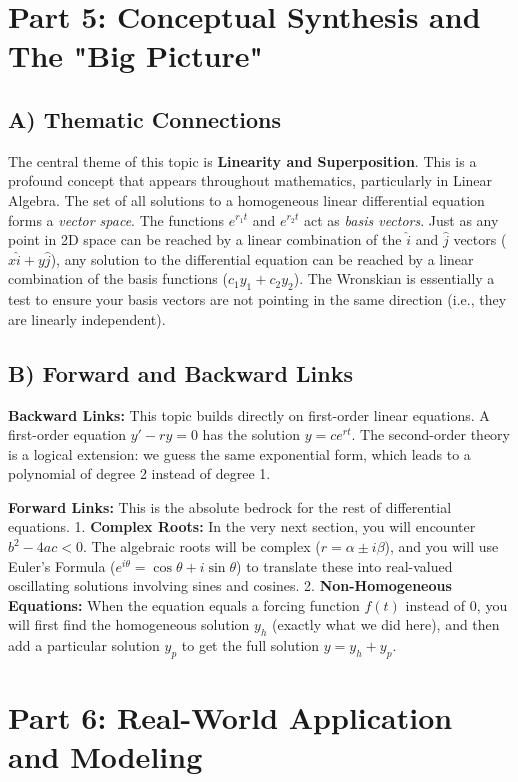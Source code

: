 \documentclass[12pt]{article}
\begin{document}
\newpage
\section{Part 5: Conceptual Synthesis and The "Big Picture"}

\subsection{A) Thematic Connections}
The central theme of this topic is \textbf{Linearity and Superposition}. This is a profound concept that appears throughout mathematics, particularly in Linear Algebra. The set of all solutions to a homogeneous linear differential equation forms a \textit{vector space}. The functions $e^{r_1 t}$ and $e^{r_2 t}$ act as \textit{basis vectors}. Just as any point in 2D space can be reached by a linear combination of the $\hat{i}$ and $\hat{j}$ vectors ($x\hat{i} + y\hat{j}$), any solution to the differential equation can be reached by a linear combination of the basis functions ($c_1 y_1 + c_2 y_2$). The Wronskian is essentially a test to ensure your basis vectors are not pointing in the same direction (i.e., they are linearly independent).

\subsection{B) Forward and Backward Links}
\textbf{Backward Links:} This topic builds directly on first-order linear equations. A first-order equation $y' - ry = 0$ has the solution $y = c e^{rt}$. The second-order theory is a logical extension: we guess the same exponential form, which leads to a polynomial of degree 2 instead of degree 1.

\textbf{Forward Links:} This is the absolute bedrock for the rest of differential equations. 
1. \textbf{Complex Roots:} In the very next section, you will encounter $b^2 - 4ac < 0$. The algebraic roots will be complex ($r = \alpha \pm i\beta$), and you will use Euler's Formula ($e^{i\theta} = \cos\theta + i\sin\theta$) to translate these into real-valued oscillating solutions involving sines and cosines.
2. \textbf{Non-Homogeneous Equations:} When the equation equals a forcing function $f(t)$ instead of $0$, you will first find the homogeneous solution $y_h$ (exactly what we did here), and then add a particular solution $y_p$ to get the full solution $y = y_h + y_p$.

\newpage
\section{Part 6: Real-World Application and Modeling}
\end{document}
